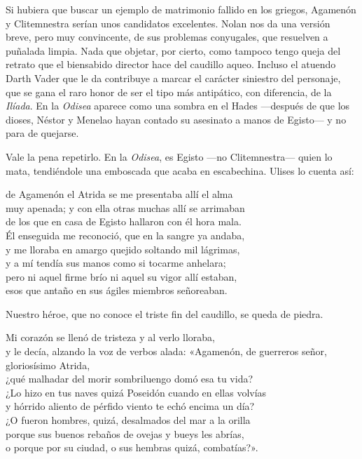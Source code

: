 \label{cap:agamenon}

Si hubiera que buscar un ejemplo de matrimonio fallido en los griegos, Agamenón y Clitemnestra serían unos candidatos excelentes. Nolan nos da una versión breve, pero muy convincente, de sus problemas conyugales, que resuelven a puñalada limpia. Nada que objetar, por cierto, como tampoco tengo queja del retrato que el biensabido director hace del caudillo aqueo. Incluso el atuendo Darth Vader que le da contribuye a marcar el carácter siniestro del personaje, que se gana el raro honor de ser el tipo más antipático, con diferencia, de la \emph{Ilíada}. En la \emph{Odisea} aparece como una sombra en el Hades ---después de que los dioses, Néstor y Menelao hayan contado su asesinato a manos de Egisto--- y no para de quejarse.

Vale la pena repetirlo. En la \emph{Odisea}, es Egisto ---no Clitemnestra--- quien lo mata, tendiéndole una emboscada que acaba en escabechina. Ulises lo cuenta así:

\begin{versocita}
de Agamenón el Atrida se me presentaba allí el alma\\
muy apenada; y con ella otras muchas allí se arrimaban\\
de los que en casa de Egisto hallaron con él hora mala.\\
Él enseguida me reconoció, que en la sangre ya andaba,\\
y me lloraba en amargo quejido soltando mil lágrimas,\\
y a mí tendía sus manos como si tocarme anhelara;\\
pero ni aquel firme brío ni aquel su vigor allí estaban,\\
esos que antaño en sus ágiles miembros señoreaban.
\end{versocita}

Nuestro héroe, que no conoce el triste fin del caudillo, se queda de piedra.

\begin{versocita}
Mi corazón se llenó de tristeza y al verlo lloraba,\\
y le decía, alzando la voz de verbos alada:
\stanzabreak
«Agamenón, de guerreros señor, gloriosísimo Atrida,\\
¿qué malhadar del morir sombriluengo domó esa tu vida?\\
¿Lo hizo en tus naves quizá Poseidón cuando en ellas volvías\\
y hórrido aliento de pérfido viento te echó encima un día?\\
¿O fueron hombres, quizá, desalmados del mar a la orilla\\
porque sus buenos rebaños de ovejas y bueys les abrías,\\
o porque por su ciudad, o sus hembras quizá, combatías?».
\end{versocita}

